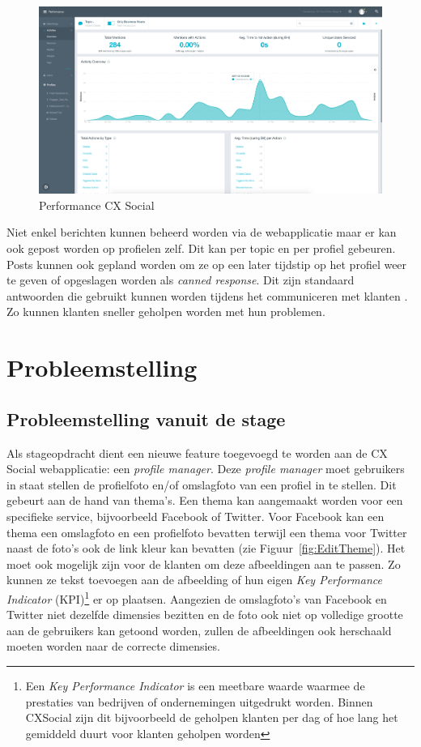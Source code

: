 \begin{figure}[H]
	\centering
	\includegraphics[width=1\textwidth]{Figuren/Performance.png}
	\caption{Performance CX Social \cite{EngagorScreenshots}} %
	\label{fig:Performance}
\end{figure} 
\fi


Niet enkel berichten kunnen beheerd worden via de webapplicatie maar er kan ook gepost worden op profielen zelf. Dit kan per topic en per profiel gebeuren. Posts kunnen ook gepland worden om ze op een later tijdstip op het profiel weer te geven  of opgeslagen worden als \textit{canned response}. Dit zijn standaard antwoorden die gebruikt kunnen worden tijdens het communiceren met klanten \cite{EngagorApp}. Zo kunnen klanten sneller geholpen worden met hun problemen.
 
\chapter{Probleemstelling}
\vspace{-3cm}
\section{Probleemstelling vanuit de stage} \label{BeschrijvingStageOpdracht}

Als stageopdracht dient een nieuwe feature toegevoegd te worden aan de CX Social webapplicatie: een \textit{profile manager}. Deze \textit{profile manager} moet gebruikers in staat stellen de profielfoto en/of omslagfoto van een profiel in te stellen. Dit gebeurt aan de hand van thema's. Een thema kan aangemaakt worden voor een specifieke service, bijvoorbeeld Facebook of Twitter. Voor Facebook kan een thema een omslagfoto en een profielfoto bevatten terwijl een thema voor Twitter naast de foto's ook de link kleur kan bevatten (zie Figuur~\ref{fig:EditTheme}). Het moet ook mogelijk zijn voor de klanten om deze afbeeldingen aan te passen. Zo kunnen ze tekst toevoegen aan de afbeelding of hun eigen \textit{Key Performance Indicator} (KPI)\footnote{Een \textit{Key Performance Indicator} is een meetbare waarde waarmee de prestaties van bedrijven of ondernemingen uitgedrukt worden. Binnen CXSocial zijn dit bijvoorbeeld de geholpen klanten per dag of hoe lang het gemiddeld duurt voor klanten geholpen worden} er op plaatsen. Aangezien de omslagfoto's van Facebook en Twitter niet dezelfde dimensies bezitten en de foto ook niet op volledige grootte aan de gebruikers kan getoond worden, zullen de afbeeldingen ook herschaald moeten worden naar de correcte dimensies.

